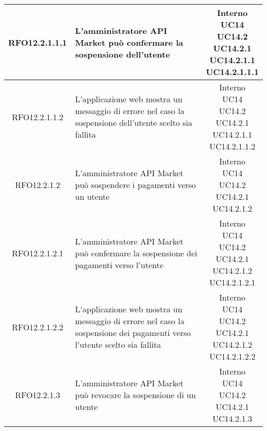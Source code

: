 \begin{longtable}{|c|p{8cm}|c|}
\hypertarget{RFO12.2.1.1.1}{RFO12.2.1.1.1} & L'amministratore API Market può confermare la sospensione dell'utente & \makecell*{Interno\\UC14\\UC14.2\\UC14.2.1\\UC14.2.1.1\\UC14.2.1.1.1} \\
\hline

\hypertarget{RFO12.2.1.1.2}{RFO12.2.1.1.2} & L'applicazione web mostra un messaggio di errore nel caso la sospensione dell'utente scelto sia fallita & \makecell*{Interno\\UC14\\UC14.2\\UC14.2.1\\UC14.2.1.1\\UC14.2.1.1.2} \\
\hline

\hypertarget{RFO12.2.1.2}{RFO12.2.1.2} & L'amministratore API Market può sospendere i pagamenti verso un utente & \makecell*{Interno\\UC14\\UC14.2\\UC14.2.1\\UC14.2.1.2} \\
\hline

\hypertarget{RFO12.2.1.2.1}{RFO12.2.1.2.1} & L'amministratore API Market può confermare la sospensione dei pagamenti verso l'utente & \makecell*{Interno\\UC14\\UC14.2\\UC14.2.1\\UC14.2.1.2\\UC14.2.1.2.1} \\
\hline

\hypertarget{RFO12.2.1.2.2}{RFO12.2.1.2.2} & L'applicazione web mostra un messaggio di errore nel caso la sospensione dei pagamenti verso l'utente scelto sia fallita & \makecell*{Interno\\UC14\\UC14.2\\UC14.2.1\\UC14.2.1.2\\UC14.2.1.2.2} \\
\hline

\hypertarget{RFO12.2.1.3}{RFO12.2.1.3} & L'amministratore API Market può revocare la sospensione di un utente & \makecell*{Interno\\UC14\\UC14.2\\UC14.2.1\\UC14.2.1.3} \\
\hline


\end{longtable}

